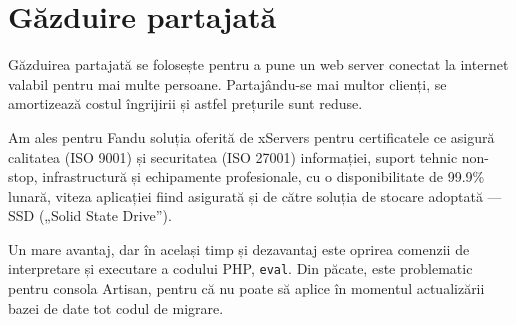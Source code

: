 \section{Găzduire partajată}

		Găzduirea partajată se folosește pentru a pune un web server conectat la internet valabil pentru mai multe persoane.
		Partajându-se mai multor clienți, se amortizează costul îngrijirii și astfel prețurile sunt reduse.

		Am ales pentru Fandu soluția oferită de xServers\cite{xservers} pentru certificatele ce asigură calitatea (ISO 9001) și securitatea (ISO 27001) informației, suport tehnic non-stop, infrastructură și echipamente profesionale, cu o disponibilitate de 99.9\% lunară, viteza aplicației fiind asigurată și de către soluția de stocare adoptată --- SSD („Solid State Drive”).

		Un mare avantaj, dar în același timp și dezavantaj este oprirea comenzii de interpretare și executare a codului PHP, \verb|eval|.
		Din păcate, este problematic pentru consola Artisan, pentru că nu poate să aplice în momentul actualizării bazei de date tot codul de migrare.


